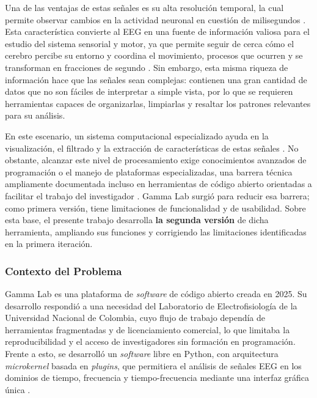 \documentclass[12pt,letterpaper,oneside]{article}
\begin{document}
Una de las ventajas de estas señales es su alta resolución temporal, la cual permite observar cambios en la actividad neuronal en cuestión de milisegundos \cite{walla2025}. Esta característica convierte al EEG en una fuente de información valiosa para el estudio del sistema sensorial y motor, ya que permite seguir de cerca cómo el cerebro percibe su entorno y coordina el movimiento, procesos que ocurren y se transforman en fracciones de segundo \cite{srinivasan2025}. Sin embargo, esta misma riqueza de información hace que las señales sean complejas: contienen una gran cantidad de datos que no son fáciles de interpretar a simple vista, por lo que se requieren herramientas capaces de organizarlas, limpiarlas y resaltar los patrones relevantes para su análisis.

En este escenario, un sistema computacional especializado ayuda en la visualización, el filtrado y la extracción de características de estas señales \cite{chaddad2023}. No obstante, alcanzar este nivel de procesamiento exige conocimientos avanzados de programación o el manejo de plataformas especializadas, una barrera técnica ampliamente documentada incluso en herramientas de código abierto orientadas a facilitar el trabajo del investigador \cite{vanes2025}. Gamma Lab surgió para reducir esa barrera; como primera versión, tiene limitaciones de funcionalidad y de usabilidad. Sobre esta base, el presente trabajo desarrolla \textbf{la segunda versión} de dicha herramienta, ampliando sus funciones y corrigiendo las limitaciones identificadas en la primera iteración.

\subsubsection{Contexto del Problema}
Gamma Lab es una plataforma de \textit{software} de código abierto creada en 2025. Su desarrollo respondió a una necesidad del Laboratorio de Electrofisiología de la Universidad Nacional de Colombia, cuyo flujo de trabajo dependía de herramientas fragmentadas y de licenciamiento comercial, lo que limitaba la reproducibilidad y el acceso de investigadores sin formación en programación. Frente a esto, se desarrolló un \textit{software} libre en Python, con arquitectura \textit{microkernel} basada en \textit{plugins}, que permitiera el análisis de señales EEG en los dominios de tiempo, frecuencia y tiempo-frecuencia mediante una interfaz gráfica única \cite{asencio2025}.
\end{document}
